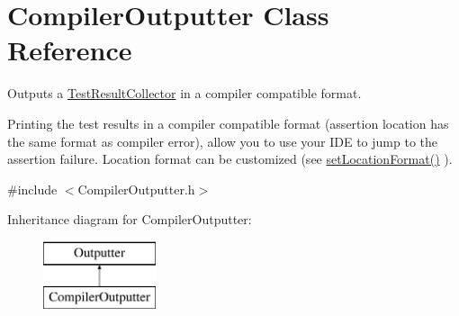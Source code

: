 \hypertarget{class_compiler_outputter}{\section{Compiler\-Outputter Class Reference}
\label{class_compiler_outputter}
}


Outputs a \hyperlink{class_test_result_collector}{Test\-Result\-Collector} in a compiler compatible format.

Printing the test results in a compiler compatible format (assertion location has the same format as compiler error), allow you to use your I\-D\-E to jump to the assertion failure. Location format can be customized (see \hyperlink{class_compiler_outputter_a0d9e67c7bdcb443b0b2754d61a10790c}{set\-Location\-Format()} ).  




{\ttfamily \#include $<$Compiler\-Outputter.\-h$>$}

Inheritance diagram for Compiler\-Outputter\-:\begin{figure}[H]
\begin{center}
\leavevmode
\includegraphics[height=2.000000cm]{class_compiler_outputter}
\end{center}
\end{figure}
